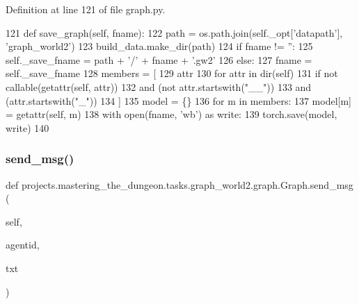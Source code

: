Definition at line 121 of file graph.\+py.


\begin{DoxyCode}
121     \textcolor{keyword}{def }save\_graph(self, fname):
122         path = os.path.join(self.\_opt[\textcolor{stringliteral}{'datapath'}], \textcolor{stringliteral}{'graph\_world2'})
123         build\_data.make\_dir(path)
124         \textcolor{keywordflow}{if} fname != \textcolor{stringliteral}{''}:
125             self.\_save\_fname = path + \textcolor{stringliteral}{'/'} + fname + \textcolor{stringliteral}{'.gw2'}
126         \textcolor{keywordflow}{else}:
127             fname = self.\_save\_fname
128         members = [
129             attr
130             \textcolor{keywordflow}{for} attr \textcolor{keywordflow}{in} dir(self)
131             \textcolor{keywordflow}{if} \textcolor{keywordflow}{not} callable(getattr(self, attr))
132             \textcolor{keywordflow}{and} (\textcolor{keywordflow}{not} attr.startswith(\textcolor{stringliteral}{"\_\_"}))
133             \textcolor{keywordflow}{and} (attr.startswith(\textcolor{stringliteral}{"\_"}))
134         ]
135         model = \{\}
136         \textcolor{keywordflow}{for} m \textcolor{keywordflow}{in} members:
137             model[m] = getattr(self, m)
138         with open(fname, \textcolor{stringliteral}{'wb'}) \textcolor{keyword}{as} write:
139             torch.save(model, write)
140 
\end{DoxyCode}
\mbox{\label{classprojects_1_1mastering__the__dungeon_1_1tasks_1_1graph__world2_1_1graph_1_1Graph_a343a58d79711988b57c6d2b3b1727ef6}} 
\subsubsection{\texorpdfstring{send\+\_\+msg()}{send\_msg()}}
{\footnotesize\ttfamily def projects.\+mastering\+\_\+the\+\_\+dungeon.\+tasks.\+graph\+\_\+world2.\+graph.\+Graph.\+send\+\_\+msg (\begin{DoxyParamCaption}\item[{}]{self,  }\item[{}]{agentid,  }\item[{}]{txt }\end{DoxyParamCaption})}



